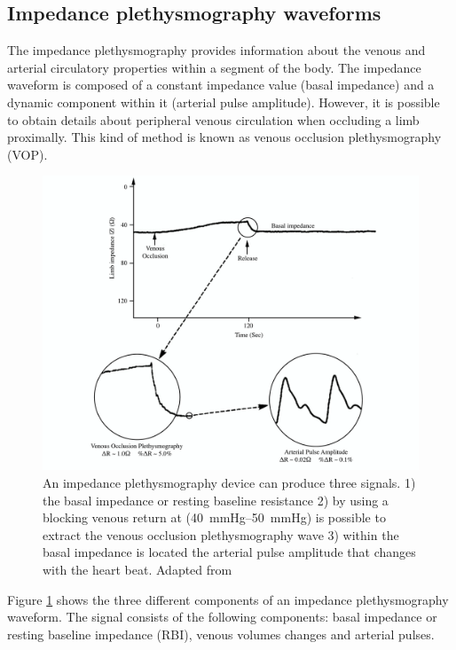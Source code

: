 \subsection{Impedance plethysmography waveforms}
\label{section impedance 9.1}
The impedance plethysmography provides information about the venous and arterial circulatory properties within a segment of the body. The impedance waveform is composed of a constant impedance value (basal impedance) and a dynamic component within it (arterial pulse amplitude). However, it is possible to obtain details about peripheral venous circulation when occluding a limb proximally. This kind of method is known as venous occlusion plethysmography (VOP).

\begin{figure}[!htpb]
	\centering
	\includegraphics[width=\textwidth,keepaspectratio]{figure16}    
	\caption[Signal from an impedance plethysmography device]{An impedance plethysmography device can produce three signals. 1) the basal impedance or resting baseline resistance 2) by using a blocking venous return at (\SIrange{40}{50}{\mmHg}) is possible to extract the venous occlusion plethysmography wave 3) within the basal impedance is located the arterial pulse amplitude that changes with the heart beat. Adapted from \cite{anderson1984impedance}}
	\label{fig:iPG signals}
\end{figure}

Figure \ref{fig:iPG signals} shows the three different components of an impedance plethysmography waveform. The signal consists of the following components: basal impedance or resting baseline impedance (RBI), venous volumes changes and arterial pulses. 

